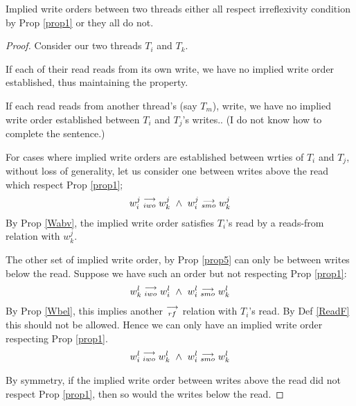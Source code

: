 
    \begin{property}
        \label{prop5}
        Implied write orders between two threads either all respect irreflexivity condition by Prop \ref{prop1} or they all do not.  
    \end{property}

    \begin{proof}
        
        Consider our two threads $T_i$ and $T_k$. 

        If each of their read reads from its own write, we have no implied write order established, thus maintaining the property.
        
        If each read reads from another thread's (say $T_m$), write, we have no implied write order established between $T_i$ and $T_j$'s writes.. (I do not know how to complete the sentence.)

        For cases where implied write orders are established between wrties of $T_i$ and $T_j$, without loss of generality, let us consider one between writes above the read which respect Prop \ref{prop1}; 
        \begin{align*}
            w_i^j\stackrel{\longrightarrow}{_{iwo}}w_k^j \ \wedge \ w_i^j\stackrel{\longrightarrow}{_{smo}}w_k^j
        \end{align*}
        By Prop \ref{Wabv}, the implied write order satisfies $T_i$'s read by a reads-from relation with $w_k^j$. 

        The other set of implied write order, by Prop \ref{prop5} can only be between writes below the read. Suppose we have such an order but not respecting Prop \ref{prop1}:
        \begin{align*}
            w_k^l\stackrel{\longrightarrow}{_{iwo}}w_i^l \ \wedge \ w_i^l\stackrel{\longrightarrow}{_{smo}}w_k^l
        \end{align*}
        By Prop \ref{Wbel}, this implies another $\stackrel{\longrightarrow}{_{rf}}$ relation with $T_i$'s read. By Def \ref{ReadF} this should not be allowed. Hence we can only have an implied write order respecting Prop \ref{prop1}.
        \begin{align*}
            w_i^l\stackrel{\longrightarrow}{_{iwo}}w_k^l \ \wedge \ w_i^l\stackrel{\longrightarrow}{_{smo}}w_k^l
        \end{align*}


        By symmetry, if the implied write order between writes above the read did not respect Prop \ref{prop1}, then so would the writes below the read.  
    \end{proof}

